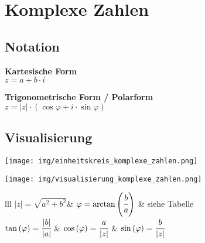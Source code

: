 \documentclass[german]{latex4ei/latex4ei_sheet}
\begin{document}
\section{Komplexe Zahlen}

\begin{sectionbox}

\subsection{Notation}
\begin{minipage}{0.39\textwidth}
	\textbf{Kartesische Form}\\
	$z = a+b \cdot i$
\end{minipage}
\begin{minipage}{0.59\textwidth}
	\textbf{Trigonometrische Form / Polarform}\\
	$z =\left| z \right| \cdot \left( \cos { \varphi } + i \cdot \sin { \varphi  } \right)$
\end{minipage}

\subsection{Visualisierung}
\begin{minipage}{0.49\textwidth}
	\texttt{[image: img/einheitskreis\_komplexe\_zahlen.png]}
\end{minipage}
\begin{minipage}{0.49\textwidth}
	\texttt{[image: img/visualisierung\_komplexe\_zahlen.png]}
\end{minipage}

	\begin{tablebox}{lll}
		$\vert z \vert = \sqrt{ {a}^{2} + {b}^{2} }$& $\varphi = \arctan \left( \cfrac{b}{a} \right) $ & siehe Tabelle \\
		$\tan\left(\varphi\right) = \cfrac{\vert b \vert}{ \vert a \vert}$ & $\cos\left(\varphi\right) = \cfrac{a}{\vert z \vert}$  & $\sin\left(\varphi\right) = \cfrac{b}{\vert z \vert}$ \\
	\end{tablebox} 
	

\end{sectionbox}
\end{document}
